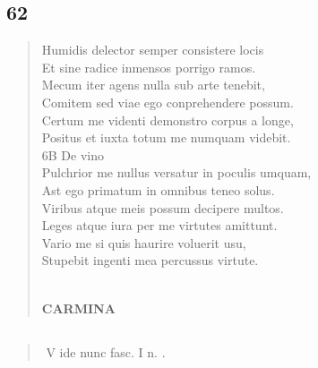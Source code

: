 \documentclass[11pt, a4paper]{report}
\begin{document}
            \subsection*{62}
      \begin{verse}
      Humidis delector semper consistere locis \\ Et sine radice inmensos porrigo ramos. \\ Mecum iter agens nulla sub arte tenebit, \\ Comitem sed viae ego conprehendere possum. \\ Certum me videnti demonstro corpus a longe, \\ Positus et iuxta totum me numquam videbit. \\ 6B De vino \\ Pulchrior me nullus versatur in poculis umquam, \\ Ast ego primatum in omnibus teneo solus. \\ Viribus atque meis possum decipere multos. \\ Leges atque iura per me virtutes amittunt. \\ Vario me si quis haurire voluerit usu, \\ Stupebit ingenti mea percussus virtute. \\ 
        ﻿\pagebreak 
    \begin{center} \textbf{CARMINA} \end{center}
      \end{verse}
  
            \subsection*{}
      \begin{verse}
      \end{verse}
  
            \subsection*{}
      \begin{verse}
        ﻿\pagebreak 
     \marginpar{[482]} V ide nunc fasc. I n. . \\ 
      \end{verse}
  
\end{document}
